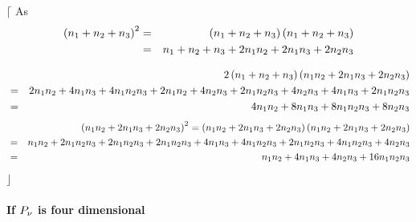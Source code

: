 \documentclass[12pt]{article}
\begin{document}
$\lceil $ As%
\begin{eqnarray}
\left( n_{1}+n_{2}+n_{3}\right) ^{2} &=&\left( n_{1}+n_{2}+n_{3}\right)
\left( n_{1}+n_{2}+n_{3}\right)  \notag \\
&=&n_{1}+n_{2}+n_{3}+2n_{1}n_{2}+2n_{1}n_{3}+2n_{2}n_{3}
\end{eqnarray}

\begin{eqnarray}
&&2\left( n_{1}+n_{2}+n_{3}\right) \left(
n_{1}n_{2}+2n_{1}n_{3}+2n_{2}n_{3}\right)  \notag \\
&=&2n_{1}n_{2}+4n_{1}n_{3}+4n_{1}n_{2}n_{3}+2n_{1}n_{2}+4n_{2}n_{3}+2n_{1}n_{2}n_{3}+4n_{2}n_{3}+4n_{1}n_{3}+2n_{1}n_{2}n_{3}
\notag \\
&=&4n_{1}n_{2}+8n_{1}n_{3}+8n_{1}n_{2}n_{3}+8n_{2}n_{3}
\end{eqnarray}%
\begin{eqnarray}
&&\left( n_{1}n_{2}+2n_{1}n_{3}+2n_{2}n_{3}\right) ^{2}=\left(
n_{1}n_{2}+2n_{1}n_{3}+2n_{2}n_{3}\right) \left(
n_{1}n_{2}+2n_{1}n_{3}+2n_{2}n_{3}\right)  \notag \\
&=&n_{1}n_{2}+2n_{1}n_{2}n_{3}+2n_{1}n_{2}n_{3}+2n_{1}n_{2}n_{3}+4n_{1}n_{3}+4n_{1}n_{2}n_{3}+2n_{1}n_{2}n_{3}+4n_{1}n_{2}n_{3}+4n_{2}n_{3}
\notag \\
&=&n_{1}n_{2}+4n_{1}n_{3}+4n_{2}n_{3}+16n_{1}n_{2}n_{3}
\end{eqnarray}%
$\rfloor $

\paragraph{If $P_{\mathcal{\protect\nu }}$ is four dimensional}
\end{document}

